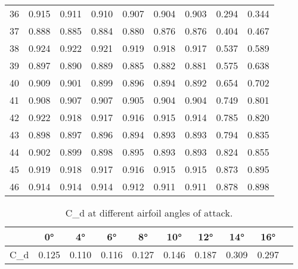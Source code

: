 \begin{table}[htpb]
\begin{tabular}{ccccccccc}
        \num{36} & \num{0.915} & \num{0.911} & \num{0.910} & \num{0.907} & \num{0.904} & \num{0.903} & \num{0.294} & \num{0.344} \\
        \num{37} & \num{0.888} & \num{0.885} & \num{0.884} & \num{0.880} & \num{0.876} & \num{0.876} & \num{0.404} & \num{0.467} \\
        \num{38} & \num{0.924} & \num{0.922} & \num{0.921} & \num{0.919} & \num{0.918} & \num{0.917} & \num{0.537} & \num{0.589} \\
        \num{39} & \num{0.897} & \num{0.890} & \num{0.889} & \num{0.885} & \num{0.882} & \num{0.881} & \num{0.575} & \num{0.638} \\
        \num{40} & \num{0.909} & \num{0.901} & \num{0.899} & \num{0.896} & \num{0.894} & \num{0.892} & \num{0.654} & \num{0.702} \\
        \num{41} & \num{0.908} & \num{0.907} & \num{0.907} & \num{0.905} & \num{0.904} & \num{0.904} & \num{0.749} & \num{0.801} \\
        \num{42} & \num{0.922} & \num{0.918} & \num{0.917} & \num{0.916} & \num{0.915} & \num{0.914} & \num{0.785} & \num{0.820} \\
        \num{43} & \num{0.898} & \num{0.897} & \num{0.896} & \num{0.894} & \num{0.893} & \num{0.893} & \num{0.794} & \num{0.835} \\
        \num{44} & \num{0.902} & \num{0.899} & \num{0.898} & \num{0.895} & \num{0.893} & \num{0.893} & \num{0.824} & \num{0.855} \\
        \num{45} & \num{0.919} & \num{0.918} & \num{0.917} & \num{0.916} & \num{0.915} & \num{0.915} & \num{0.873} & \num{0.895} \\
        \num{46} & \num{0.914} & \num{0.914} & \num{0.914} & \num{0.912} & \num{0.911} & \num{0.911} & \num{0.878} & \num{0.898} \\
        \bottomrule
    \end{tabular}
\end{table}

\begin{table}[htpb]
    \caption{\gls{C_d} at different airfoil angles of attack.}
    \label{tab:CD_data}
    \centering
    \begin{tabular}{cccccccccc}
        \toprule
        & \num{0}\unit{\degree} & \num{4}\unit{\degree} & \num{6}\unit{\degree} & \num{8}\unit{\degree} & \num{10}\unit{\degree} & \num{12}\unit{\degree} & \num{14}\unit{\degree} & \num{16}\unit{\degree}\\
        \midrule
        \gls{C_d} & \num{0.125} & \num{0.110} & \num{0.116} & \num{0.127} & \num{0.146} & \num{0.187} & \num{0.309} & \num{0.297} \\
        \bottomrule
    \end{tabular} 
\end{table}

